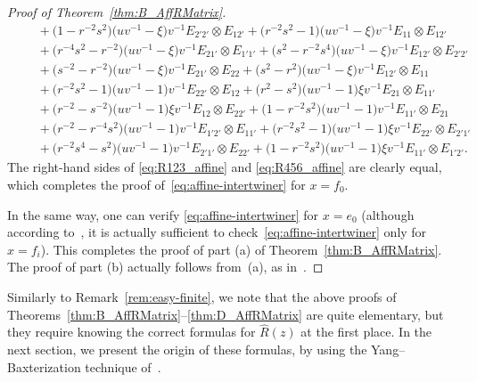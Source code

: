 \documentclass[10pt,a4paper]{amsart}
\numberwithin{equation}{section}
\begin{document}
\begin{proof}[Proof of Theorem~\ref{thm:B_AffRMatrix}]
\begin{gather}
 \qquad{} + \bigl(1 - r^{-2}s^{2}\bigr)\bigl(uv^{-1} - \xi\bigr)v^{-1}E_{2'2'} \otimes E_{12'} + \bigl(r^{-2}s^{2} - 1\bigr)\bigl(uv^{-1} - \xi\bigr)v^{-1}E_{11} \otimes E_{12'} \nonumber\\
 \qquad{} + \bigl(r^{-4}s^{2} - r^{-2}\bigr)\bigl(uv^{-1} -\xi\bigr)v^{-1}E_{21'} \otimes E_{1'1'} + \bigl(s^{2} - r^{-2}s^{4}\bigr)\bigl(uv^{-1} - \xi\bigr)v^{-1}E_{12'} \otimes E_{2'2'} \nonumber\\
 \qquad{} + \bigl(s^{-2} - r^{-2}\bigr)\bigl(uv^{-1} - \xi\bigr)v^{-1}E_{21'} \otimes E_{22} + \bigl(s^{2} - r^{2}\bigr)\bigl(uv^{-1} - \xi\bigr)v^{-1}E_{12'} \otimes E_{11} \nonumber\\
 \qquad{} +\bigl(r^{-2}s^{2} - 1\bigr)\bigl(uv^{-1} - 1\bigr)v^{-1}E_{22'} \otimes E_{12} +\bigl(r^{2} - s^{2}\bigr)\bigl(uv^{-1} - 1\bigr)\xi v^{-1}E_{21} \otimes E_{11'} \nonumber\\
 \qquad{} + \bigl(r^{-2} - s^{-2}\bigr)\bigl(uv^{-1} - 1\bigr)\xi v^{-1}E_{12} \otimes E_{22'} + \bigl(1 - r^{-2}s^{2}\bigr)\bigl(uv^{-1} - 1\bigr)v^{-1}E_{11'} \otimes E_{21} \nonumber\\
 \qquad{} +\bigl(r^{-2} - r^{-4}s^{2}\bigr)\bigl(uv^{-1} - 1\bigr)v^{-1}E_{1'2'} \otimes E_{11'} + \bigl(r^{-2}s^{2} - 1\bigr)\bigl(uv^{-1} - 1\bigr)\xi v^{-1}E_{22'} \otimes E_{2'1'} \nonumber\\
 \qquad{} + \bigl(r^{-2}s^{4} - s^{2}\bigr)\bigl(uv^{-1} - 1\bigr)v^{-1}E_{2'1'} \otimes E_{22'} + \bigl(1 - r^{-2}s^{2}\bigr)\bigl(uv^{-1} - 1\bigr)\xi v^{-1}E_{11'} \otimes E_{1'2'}.\nonumber
\end{gather}
The right-hand sides of \eqref{eq:R123_affine} and \eqref{eq:R456_affine} are clearly equal, which completes the proof of~\eqref{eq:affine-intertwiner} for $x = f_{0}$.

In the same way, one can verify \eqref{eq:affine-intertwiner} for $x = e_{0}$ (although according to~\cite{Jim}, it is actually sufficient to check~\eqref{eq:affine-intertwiner} only for $x = f_{i}$). This completes the proof of part (a) of Theorem~\ref{thm:B_AffRMatrix}. The proof of part (b) actually follows from~(a), as in~\cite[Proposition~3]{Jim}.
\end{proof}


\begin{Remark}%
Similarly to Remark~\ref{rem:easy-finite}, we note that the above proofs of Theorems~\ref{thm:B_AffRMatrix}--\ref{thm:D_AffRMatrix} are quite elementary, but they require knowing the correct formulas for $\hat{R}(z)$ at the first place. In the next section, we present the origin of these formulas, by using the Yang--Baxterization technique of~\cite{GWX}.
\end{Remark}
\end{document}
